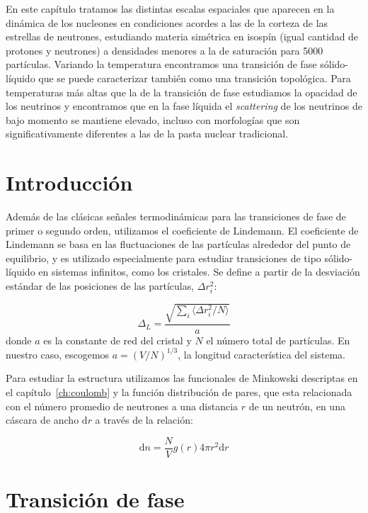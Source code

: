 En este capítulo tratamos las distintas escalas espaciales que aparecen en la dinámica de los nucleones en condiciones acordes a las de la corteza de las estrellas de neutrones, estudiando materia simétrica en isospín (igual cantidad de protones y neutrones) a densidades menores a la de saturación para 5000 partículas.
Variando la temperatura encontramos una transición de fase sólido-líquido que se puede caracterizar también como una transición topológica.
Para temperaturas más altas que la de la transición de fase estudiamos la opacidad de los neutrinos y encontramos que en la fase líquida el \emph{scattering} de los neutrinos de bajo momento se mantiene elevado, incluso con morfologías que son significativamente diferentes a las de la pasta nuclear tradicional.


\section{Introducción}

Además de las clásicas señales termodinámicas para las transiciones de fase de primer o segundo orden, utilizamos el coeficiente de Lindemann.
El coeficiente de Lindemann se basa en las fluctuaciones de las partículas alrededor del punto de equilibrio, y es utilizado especialmente para estudiar transiciones de tipo sólido-líquido en sistemas infinitos, como los cristales.
Se define a partir de la desviación estándar de las posiciones de las partículas, $\Delta r_i^2$:

\begin{equation*}
\Delta_L = \frac{\sqrt{\sum_i\langle\Delta r_i^2/N\rangle}}{a}
\end{equation*}
donde $a$ es la constante de red del cristal y $N$ el número total de partículas.
En nuestro caso, escogemos $a=(V/N)^{1/3}$, la longitud característica del sistema.

Para estudiar la estructura utilizamos las funcionales de Minkowski descriptas en el capítulo~\ref{ch:coulomb} y la función distribución de pares, que esta relacionada con el número promedio de neutrones a una distancia $r$ de un neutrón, en una cáscara de ancho $\text{d}r$ a través de la relación:

\begin{equation}
\text{d}n = \frac{N}{V} g(r) 4\pi r^2 \text{d}r
\end{equation}


\section{Transición de fase}\label{phase_transition}
